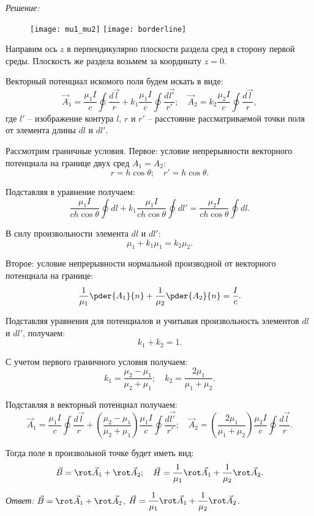 \vspace*{2em}
\emph{Решение:}

\begin{figure}[h!]
	\texttt{[image: mu1\_mu2]} \hspace*{2em}
	\texttt{[image: borderline]}
\end{figure}

Направим ось \( z \) в перпендикулярно плоскости раздела сред в сторону первой
среды. Плоскость же раздела возьмем за координату \( z = 0 \).

Векторный потенциал искомого поля будем искать в виде:
\[
	\vec{A}_1 = \frac{\mu_1 I}{c} \oint \frac{d\vec{l}}{r} + k_1\frac{\mu_1 I}{c}
	\oint \frac{d\vec{l'}}{r'}; \quad
	\vec{A}_2 = k_2\frac{\mu_2 I}{c} \oint \frac{d\vec{l}}{r},
\]
где \( l' \) -- изображение контура \( l \), \( r \) и \( r' \) -- расстояние
рассматриваемой точки поля от элемента длины \( dl \) и \( dl' \).

Рассмотрим граничные условия. Первое: условие непрерывности векторного
потенциала на границе двух сред \( A_1 = A_2 \):
\[
	r = h\cos\theta; \quad r' = h\cos\theta.
\]

Подставляя в уравнение получаем:
\[
	\frac{\mu_1 I}{ch\cos\theta} \oint dl + k_1\frac{\mu_1 I}{ch\cos\theta}
	\oint dl' = \frac{\mu_2 I}{ch\cos\theta} \oint dl.
\]

В силу произвольности элемента \( dl \) и \( dl' \):
\[ 
	\mu_1 + k_1\mu_1 = k_2\mu_2.
\]

Второе: условие непрерывности нормальной производной от векторного потенциала
на границе:
\[
	\frac{1}{\mu_1}\pder{A_1}{n} + \frac{1}{\mu_2}\pder{A_2}{n} = \frac{I}{c}.
\]

Подставляя уравнения для потенциалов и учитывая произвольность элементов 
\( dl \) и \( dl' \), получаем:
\[
	k_1 + k_2 = 1.
\]

С учетом первого граничного условия получаем:
\[
	k_1 = \frac{\mu_2 - \mu_1}{\mu_2 + \mu_1}; \quad
	k_2 = \frac{2\mu_1}{\mu_1 + \mu_2}.
\]

Подставляя в векторный потенциал получаем:
\[
	\vec{A}_1 = \frac{\mu_1 I}{c} \oint \frac{d\vec{l}}{r} + 
	\left(\frac{\mu_2 - \mu_1}{\mu_2 + \mu_1}\right)
	\frac{\mu_1 I}{c} \oint \frac{d\vec{l'}}{r'}; \quad
	\vec{A}_2 = \left(\frac{2\mu_1}{\mu_1 + \mu_2}\right)
	\frac{\mu_2 I}{c} \oint \frac{d\vec{l}}{r}.
\]

Тогда поле в произвольной точке будет иметь вид:
\[
	\vec{B} = \rot\vec{A}_1 + \rot\vec{A}_2; \quad
	\vec{H} = \frac{1}{\mu_1}\rot\vec{A}_1 + \frac{1}{\mu_2}\rot\vec{A}_2.
\]

\emph{Ответ:} \( \ds \vec{B} = \rot\vec{A}_1 + \rot\vec{A}_2 \),
\( \ds \vec{H} = \frac{1}{\mu_1}\rot\vec{A}_1 + \frac{1}{\mu_2}\rot\vec{A}_2 \).

